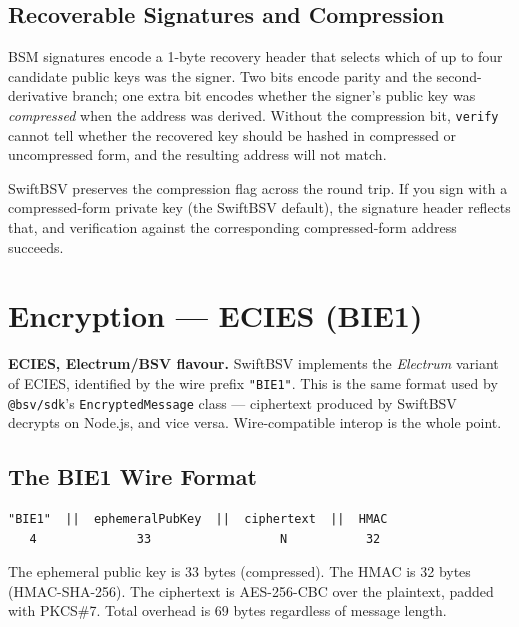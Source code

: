 \documentclass[a4paper, 11pt, openany]{book}
\begin{document}
\section{Recoverable Signatures and Compression}

BSM signatures encode a 1-byte recovery header that selects which of up to four candidate public keys was the signer. Two bits encode parity and the second-derivative branch; one extra bit encodes whether the signer's public key was \emph{compressed} when the address was derived. Without the compression bit, \texttt{verify} cannot tell whether the recovered key should be hashed in compressed or uncompressed form, and the resulting address will not match.

SwiftBSV preserves the compression flag across the round trip. If you sign with a compressed-form private key (the SwiftBSV default), the signature header reflects that, and verification against the corresponding compressed-form address succeeds.

\chapter{Encryption — ECIES (BIE1)}

\begin{notebox}
\textbf{ECIES, Electrum/BSV flavour.} SwiftBSV implements the \emph{Electrum} variant of ECIES, identified by the wire prefix \texttt{"BIE1"}. This is the same format used by \texttt{@bsv/sdk}'s \texttt{EncryptedMessage} class --- ciphertext produced by SwiftBSV decrypts on Node.js, and vice versa. Wire-compatible interop is the whole point.
\end{notebox}

\section{The BIE1 Wire Format}

\begin{verbatim}
"BIE1"  ||  ephemeralPubKey  ||  ciphertext  ||  HMAC
   4              33                  N           32
\end{verbatim}

The ephemeral public key is 33 bytes (compressed). The HMAC is 32 bytes (HMAC-SHA-256). The ciphertext is AES-256-CBC over the plaintext, padded with PKCS\#7. Total overhead is 69 bytes regardless of message length.
\end{document}
